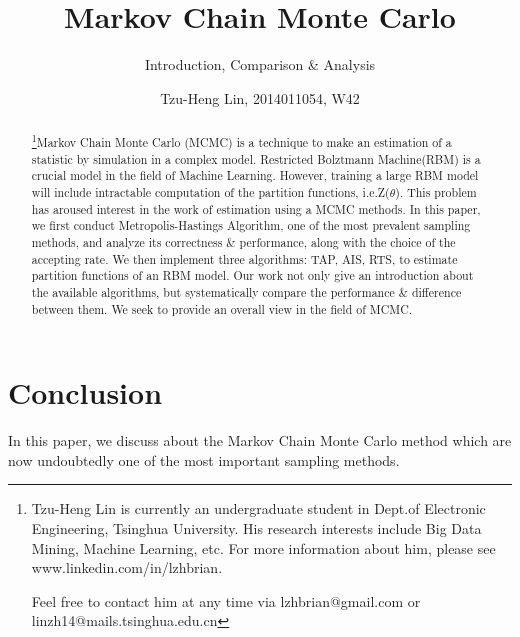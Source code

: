 \documentclass{sig-alternate-05-2015}
\begin{document}
\title{Markov Chain Monte Carlo}
\subtitle{Introduction, Comparison \& Analysis}
\author{
    \alignauthor Tzu-Heng Lin, 2014011054, W42\\
}


\maketitle
\begin{abstract}
\footnote{Tzu-Heng Lin is currently an undergraduate student in Dept.of Electronic Engineering, Tsinghua University. His research interests include Big Data Mining, Machine Learning, etc. For more information about him, please see www.linkedin.com/in/lzhbrian. 

Feel free to contact him at any time via lzhbrian@gmail.com or linzh14@mails.tsinghua.edu.cn}Markov Chain Monte Carlo (MCMC) is a technique to make an estimation of a statistic by simulation in a complex model. Restricted Bolztmann Machine(RBM) is a crucial model in the field of Machine Learning. However, training a large RBM model will include intractable computation of the partition functions, i.e.Z($\theta$). This problem has aroused interest in the work of estimation using a MCMC methods.
In this paper, we first conduct Metropolis-Hastings Algorithm, one of the most prevalent sampling methods, and analyze its correctness \& performance, along with the choice of the accepting rate. We then implement three algorithms: TAP, AIS, RTS, to estimate partition functions of an RBM model. Our work not only give an introduction about the available algorithms, but systematically compare the performance \& difference between them. We seek to provide an overall view in the field of MCMC.
\end{abstract}




%
%
\printccsdesc












\section{Conclusion} \label{sec:conclusion}
In this paper, we discuss about the Markov Chain Monte Carlo method which are now undoubtedly one of the most important sampling methods.
\end{document}
